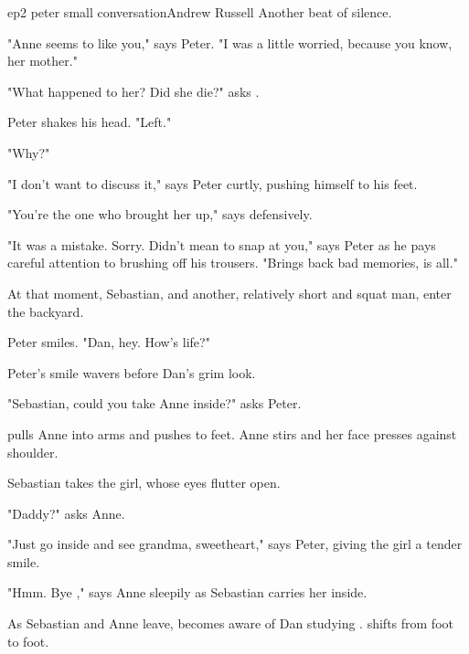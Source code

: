 \documentclass{book}
\begin{document}
\begin{childnode}{ep2 peter small conversation}{Andrew Russell}
    Another beat of silence.

    "Anne seems to like you," says Peter. "I was a little worried, because you know, her mother."

    "What happened to her? Did she die?" asks \name{}.

    Peter shakes his head. "Left."

    "Why?"

    "I don't want to discuss it," says Peter curtly, pushing himself to his feet.

    "You're the one who brought her up," says \name{} defensively.

    "It was a mistake. Sorry. Didn't mean to snap at you," says Peter as he pays careful attention to brushing off his trousers. "Brings back bad memories, is all."

    At that moment, Sebastian, and another, relatively short and squat man, enter the backyard.

    Peter smiles. "Dan, hey. How's life?"

    Peter's smile wavers before Dan's grim look.

    "Sebastian, could you take Anne inside?" asks Peter.

    \name{} pulls Anne into \hisher{} arms and pushes \himselfherself{} to \hisher{} feet. Anne stirs and her face presses against \names{} shoulder.

    Sebastian takes the girl, whose eyes flutter open.

    "Daddy?" asks Anne.

    "Just go inside and see grandma, sweetheart," says Peter, giving the girl a tender smile.

    "Hmm. Bye \nickname{}," says Anne sleepily as Sebastian carries her inside.

    As Sebastian and Anne leave, \name{} becomes aware of Dan studying \himher{}. \name{} shifts from foot to foot.


\end{childnode}
\end{document}
